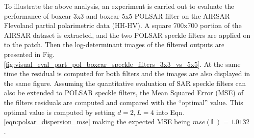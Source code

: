 
To illustrate the above analysis, an experiment is carried out to evaluate the performance of boxcar 3x3 and boxcar 5x5 POLSAR filter on the AIRSAR Flevoland partial polarimetric data (HH-HV).
A square 700x700 portion of the AIRSAR dataset is extracted,
  and the two POLSAR speckle filters are applied on to the patch.
Then the log-determinant images of the filtered outputs are presented in Fig. \ref{fig:visual_eval_part_pol_boxcar_speckle_filters_3x3_vs_5x5}.
At the same time the residual is computed for both filters and the images are also displayed in the same figure.
Assuming the quantitative evaluation of SAR speckle filters can also be extended to POLSAR speckle filters,
  the Mean Squared Error (MSE) of the filters residuals are computed and compared with the ``optimal'' value.
This optimal value is computed   
by setting $d=2,L=4$ into Eqn. \ref{eqn:polsar_dispersion_mse} making the expected MSE being $mse(\mathbb{L})=1.0132$.

